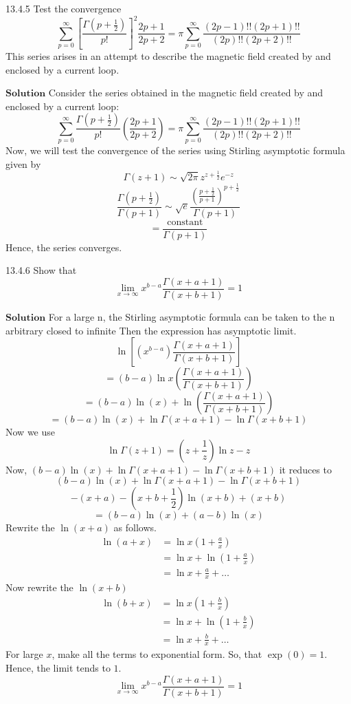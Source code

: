 \documentclass{styles/kaobook}
\begin{document}
\begin{greenbox}{13.4.5}
Test the convergence
$$
\sum_{p=0}^{\infty}\left[\frac{\Gamma\left(p+\frac{1}{2}\right)}{p !}\right]^{2} \frac{2 p+1}{2 p+2}=\pi \sum_{p=0}^{\infty} \frac{(2 p-1) ! !(2 p+1) ! !}{(2 p) ! !(2 p+2) ! !}
$$
This series arises in an attempt to describe the magnetic field created by and enclosed by a current loop.
\end{greenbox}
$\boxed{\textbf{Solution}}$ Consider the series obtained in the magnetic field created by and enclosed by a current loop:
$$
\sum_{p=0}^{\infty} \frac{\Gamma\left(p+\frac{1}{2}\right)}{p !}\left(\frac{2 p+1}{2 p+2}\right)=\pi \sum_{p=0}^{\infty} \frac{(2 p-1) ! !(2 p+1) ! !}{(2 p) ! !(2 p+2) ! !}
$$
Now, we will test the convergence of the series using Stirling asymptotic formula given by
$$
\Gamma(z+1) \sim \sqrt{2 \pi} z^{z+\frac{1}{2}} e^{-z}
$$
$$
\frac{\Gamma\left(p+\frac{1}{2}\right)}{\Gamma(p+1)} \sim \sqrt{e} \frac{\left(\frac{p+\frac{1}{2}}{p+1}\right)^{p+\frac{1}{2}}}{\Gamma(p+1)}
$$
$$
=\frac{\text { constant }}{\Gamma(p+1)}
$$
Hence, the series converges.



\begin{greenbox}{13.4.6}
Show that 
$$\lim _{x \rightarrow \infty} x^{b-a} \frac{\Gamma(x+a+1)}{\Gamma(x+b+1)}=1$$
\end{greenbox}
$\boxed{\textbf{Solution}}$ For a large $\mathrm{n}$, the Stirling asymptotic formula can be taken to the $\mathrm{n}$ arbitrary closed to infinite
Then the expression has asymptotic limit.
$$\ln \left[\left(x^{b-a}\right) \frac{\Gamma(x+a+1)}{\Gamma(x+b+1)}\right]$$
$$=(b-a) \ln x\left(\frac{\Gamma(x+a+1)}{\Gamma(x+b+1)}\right)$$
$$=(b-a) \ln (x)+\ln \left(\frac{\Gamma(x+a+1)}{\Gamma(x+b+1)}\right)$$
$$=(b-a) \ln (x)+\ln \Gamma(x+a+1)-\ln \Gamma(x+b+1)$$
Now we use 
$$
\ln \Gamma(z+1)=\left(z+\frac{1}{z}\right) \ln z-z
$$
Now, $(b-a) \ln (x)+\ln \Gamma(x+a+1)-\ln \Gamma(x+b+1)$ it reduces to
$$
(b-a) \ln (x)+\ln \Gamma(x+a+1)-\ln \Gamma(x+b+1)
$$
$$
-(x+a)-\left(x+b+\frac{1}{2}\right) \ln (x+b)+(x+b)
$$
$$
=(b-a) \ln (x)+(a-b) \ln (x)
$$
Rewrite the $\ln (x+a)$ as follows.
$$
\begin{aligned}
\ln (a+x) &=\ln x\left(1+\frac{a}{x}\right) \\
&=\ln x+\ln \left(1+\frac{a}{x}\right) \\
&=\ln x+\frac{a}{x}+\ldots
\end{aligned}
$$
Now rewrite the $\ln (x+b)$
$$
\begin{aligned}
\ln (b+x) &=\ln x\left(1+\frac{b}{x}\right) \\
&=\ln x+\ln \left(1+\frac{b}{x}\right) \\
&=\ln x+\frac{b}{x}+\ldots
\end{aligned}
$$
For large $x$, make all the terms to exponential form. So, that $\exp (0)=1$. Hence, the limit tends to $1 .$
$$
\lim _{x \rightarrow \infty} x^{b-a} \frac{\Gamma(x+a+1)}{\Gamma(x+b+1)}=1
$$
\end{document}

